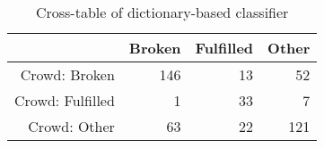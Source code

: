 \begin{table}[ht]
\centering
\caption{Cross-table of dictionary-based classifier} 
\label{tab:classification}
\begingroup\footnotesize
\begin{tabular}{rrrr}
  \hline
 & Broken & Fulfilled & Other \\ 
  \hline
Crowd: Broken & 146 &  13 &  52 \\ 
  Crowd: Fulfilled &   1 &  33 &   7 \\ 
  Crowd: Other &  63 &  22 & 121 \\ 
   \hline
\end{tabular}
\endgroup
\end{table}
